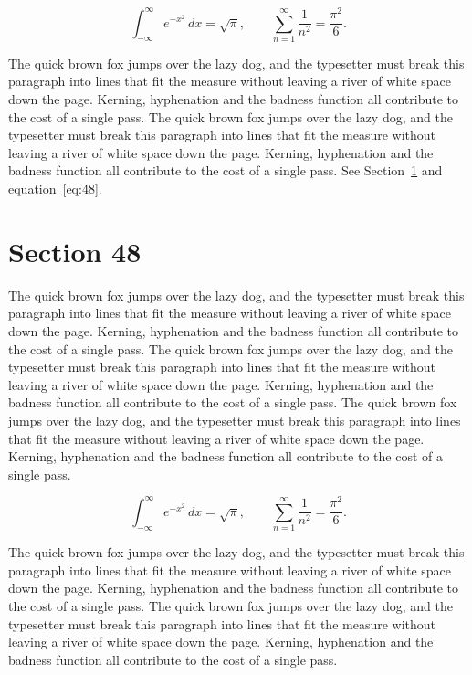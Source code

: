 \documentclass{article}
\begin{document}
\begin{equation}\label{eq:47}
\int_{-\infty}^{\infty} e^{-x^{2}}\,dx = \sqrt{\pi}, \qquad
\sum_{n=1}^{\infty} \frac{1}{n^{2}} = \frac{\pi^{2}}{6}.
\end{equation}

The quick brown fox jumps over the lazy dog, and the typesetter must break this paragraph into lines that fit the measure without leaving a river of white space down the page. Kerning, hyphenation and the badness function all contribute to the cost of a single pass. The quick brown fox jumps over the lazy dog, and the typesetter must break this paragraph into lines that fit the measure without leaving a river of white space down the page. Kerning, hyphenation and the badness function all contribute to the cost of a single pass. 
See Section~\ref{sec:48} and equation~\eqref{eq:48}.
\section{Section 48}
\label{sec:48}
The quick brown fox jumps over the lazy dog, and the typesetter must break this paragraph into lines that fit the measure without leaving a river of white space down the page. Kerning, hyphenation and the badness function all contribute to the cost of a single pass. The quick brown fox jumps over the lazy dog, and the typesetter must break this paragraph into lines that fit the measure without leaving a river of white space down the page. Kerning, hyphenation and the badness function all contribute to the cost of a single pass. The quick brown fox jumps over the lazy dog, and the typesetter must break this paragraph into lines that fit the measure without leaving a river of white space down the page. Kerning, hyphenation and the badness function all contribute to the cost of a single pass. 

\begin{equation}\label{eq:48}
\int_{-\infty}^{\infty} e^{-x^{2}}\,dx = \sqrt{\pi}, \qquad
\sum_{n=1}^{\infty} \frac{1}{n^{2}} = \frac{\pi^{2}}{6}.
\end{equation}

The quick brown fox jumps over the lazy dog, and the typesetter must break this paragraph into lines that fit the measure without leaving a river of white space down the page. Kerning, hyphenation and the badness function all contribute to the cost of a single pass. The quick brown fox jumps over the lazy dog, and the typesetter must break this paragraph into lines that fit the measure without leaving a river of white space down the page. Kerning, hyphenation and the badness function all contribute to the cost of a single pass. 
\end{document}

